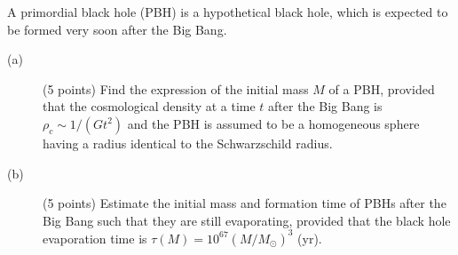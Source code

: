 A primordial black hole (PBH) is a hypothetical black hole, which is expected
to be formed very soon after the Big Bang.

\begin{description}
\item[(a)] (5 points) Find the expression of the initial mass $M$ of a PBH,
  provided that the cosmological density at a time $t$ after the Big Bang is
  $\rho_c \sim 1/(Gt^2)$ and the PBH is assumed to be a homogeneous sphere
  having a radius identical to the Schwarzschild radius.
\item[(b)] (5 points) Estimate the initial mass and formation time of PBHs
  after the Big Bang such that they are still evaporating, provided that the
  black hole evaporation time is
  $\tau(M) = 10^{67}\left(M/M_\odot\right)^3$ (yr).
\end{description}
